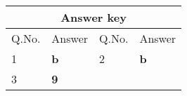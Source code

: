 \begin{table}[H]
	\centering
	
	\begin{tabular}{|p{1.5cm}|p{1.5cm}||p{1.5cm}|p{1.5cm}|}
		\hline
		\multicolumn{4}{|c|}{\textbf{Answer key}}\\\hline\hline
		\rowcolor{ocrel}Q.No.&Answer&Q.No.&Answer\\\hline
		1&\textbf{b}&2&\textbf{b}\\\hline
		3&\textbf{9}&&\\\hline
	\end{tabular}
\end{table}












































